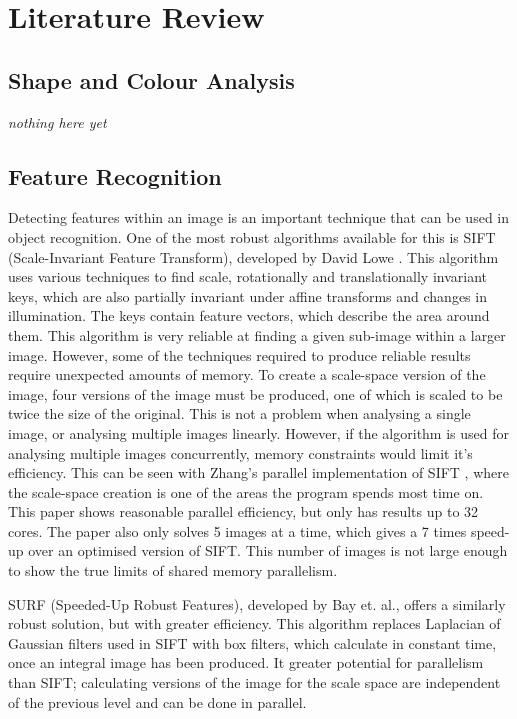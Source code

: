 \documentclass[../main.tex]{subfiles}
\begin{document}
  \section{Literature Review}
    \subsection{Shape and Colour Analysis}
      \textit{nothing here yet}
    \subsection{Feature Recognition}
      Detecting features within an image is an important technique that can be used in object recognition.
      One of the most robust algorithms available for this is SIFT (Scale-Invariant Feature Transform), developed by David Lowe \cite{sift}.
      This algorithm uses various techniques to find scale, rotationally and translationally invariant keys, which are also partially invariant under affine transforms and changes in illumination.
      The keys contain feature vectors, which describe the area around them.
      This algorithm is very reliable at finding a given sub-image within a larger image.
      However, some of the techniques required to produce reliable results require unexpected amounts of memory.
      To create a scale-space version of the image, four versions of the image must be produced, one of which is scaled to be twice the size of the original.
      This is not a problem when analysing a single image, or analysing multiple images linearly.
      However, if the algorithm is used for analysing multiple images concurrently, memory constraints would limit it's efficiency.
      This can be seen with Zhang's parallel implementation of SIFT \cite{zhangsift}, where the scale-space creation is one of the areas the program spends most time on.
      This paper shows reasonable parallel efficiency, but only has results up to 32 cores.
      The paper also only solves 5 images at a time, which gives a 7 times speed-up over an optimised version of SIFT.
      This number of images is not large enough to show the true limits of shared memory parallelism.

      SURF (Speeded-Up Robust Features), developed by Bay et. al.\cite{surf}, offers a similarly robust solution, but with greater efficiency.
      This algorithm replaces Laplacian of Gaussian filters used in SIFT with box filters, which calculate in constant time, once an integral image has been produced.
      It greater potential for parallelism than SIFT; calculating versions of the image for the scale space are independent of the previous level and can be done in parallel.
      
    \biblio
\end{document}
